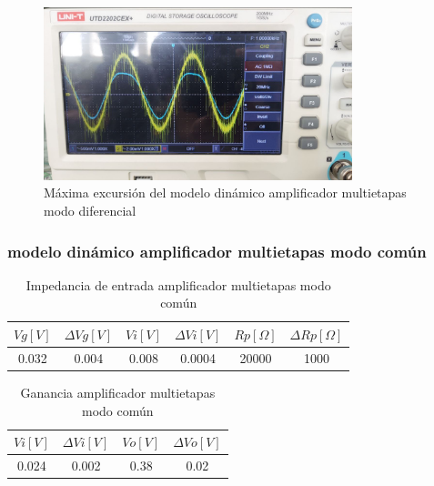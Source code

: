 \begin{figure}[ht]
    \centering
    \includegraphics[width=0.8\textwidth]{src/images/resultados/p3/max-excursion-multietapas-mod-diff.png}
    \caption{Máxima excursión del modelo dinámico amplificador multietapas modo diferencial}
    \label{fig:med-max-excursion-multietapas-mod-diff}
\end{figure}

\FloatBarrier
\subsubsection{modelo dinámico amplificador multietapas modo común}

\begin{table}[h!]
\centering
\begin{tabular}{|c|c|c|c|c|c|}
\hline
\textbf{\(Vg[V]\)} & \textbf{\(\varDelta Vg[V]\)} & \textbf{\(Vi[V]\)} & \textbf{\(\varDelta Vi[V]\)} & \textbf{\(Rp[\Omega]\)} & \textbf{\(\varDelta Rp[\Omega]\)} \\ \hline
0.032 & 0.004 & 0.008 & 0.0004 & 20000 & 1000 \\ \hline
\end{tabular}
\caption{Impedancia de entrada amplificador multietapas modo común}
\label{tab:med-impedancia-entrada-amplificador-multietapas-modo-comun}
\end{table}


\begin{table}[h!]
\centering
\begin{tabular}{|c|c|c|c|}
\hline
\textbf{\(Vi[V]\)} & \textbf{\(\varDelta Vi[V]\)} & \textbf{\(Vo[V]\)} & \textbf{\(\varDelta Vo[V]\)} \\ \hline
0.024 & 0.002 & 0.38 & 0.02 \\ \hline
\end{tabular}
\caption{Ganancia amplificador multietapas modo común}
\label{tab:med-ganancia-amplificador-multietapas-modo-comun}
\end{table}

